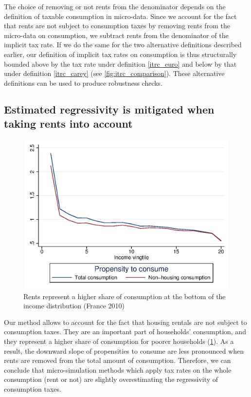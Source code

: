 The choice of removing or not rents from the denominator depends on the definition of taxable consumption in micro-data. Since we account for the fact that rents are not subject to consumption taxes by removing rents from the micro-data on consumption, we subtract rents from the denominator of the implicit tax rate. If we do the same for the two alternative definitions described earlier, our definition of implicit tax rates on consumption is thus structurally bounded above by the tax rate under definition \eqref{itrc_euro} and below by that under definition \eqref{itrc_carey} (see \cref{fig:itrc_comparison}). These alternative definitions can be used to produce robustness checks.

\subsection{Estimated regressivity is mitigated when taking rents into account}
\label{sec:rents}
\begin{figure}[!h]
\centering
\includegraphics[height=0.4\textheight]{images/18-11-18_total_nonrent_propensity_fr10}
\caption{Rents represent a higher share of consumption at the bottom of the income distribution (France 2010)}
\label{fig:total_nonrent}  
\end{figure}

Our method allows to account for the fact that housing rentals are not subject to consumption taxes. They are an important part of households' consumption, and they represent a higher share of consumption for poorer households (\cref{fig:total_nonrent}). As a result, the downward slope of propensities to consume are less pronounced when rents are removed from the total amount of consumption. Therefore, we can conclude that micro-simulation methods which apply tax rates on the whole consumption (rent or not) are slightly overestimating the regressivity of consumption taxes.

